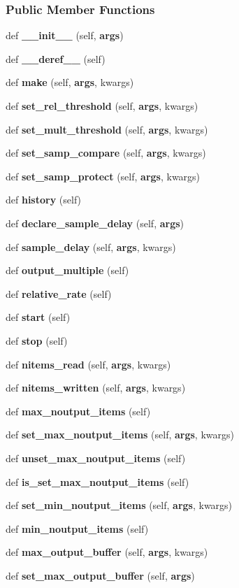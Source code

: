 \subsubsection*{Public Member Functions}
\begin{DoxyCompactItemize}
\item 
def {\bf \+\_\+\+\_\+init\+\_\+\+\_\+} (self, {\bf args})
\item 
def {\bf \+\_\+\+\_\+deref\+\_\+\+\_\+} (self)
\item 
def {\bf make} (self, {\bf args}, kwargs)
\item 
def {\bf set\+\_\+rel\+\_\+threshold} (self, {\bf args}, kwargs)
\item 
def {\bf set\+\_\+mult\+\_\+threshold} (self, {\bf args}, kwargs)
\item 
def {\bf set\+\_\+samp\+\_\+compare} (self, {\bf args}, kwargs)
\item 
def {\bf set\+\_\+samp\+\_\+protect} (self, {\bf args}, kwargs)
\item 
def {\bf history} (self)
\item 
def {\bf declare\+\_\+sample\+\_\+delay} (self, {\bf args})
\item 
def {\bf sample\+\_\+delay} (self, {\bf args}, kwargs)
\item 
def {\bf output\+\_\+multiple} (self)
\item 
def {\bf relative\+\_\+rate} (self)
\item 
def {\bf start} (self)
\item 
def {\bf stop} (self)
\item 
def {\bf nitems\+\_\+read} (self, {\bf args}, kwargs)
\item 
def {\bf nitems\+\_\+written} (self, {\bf args}, kwargs)
\item 
def {\bf max\+\_\+noutput\+\_\+items} (self)
\item 
def {\bf set\+\_\+max\+\_\+noutput\+\_\+items} (self, {\bf args}, kwargs)
\item 
def {\bf unset\+\_\+max\+\_\+noutput\+\_\+items} (self)
\item 
def {\bf is\+\_\+set\+\_\+max\+\_\+noutput\+\_\+items} (self)
\item 
def {\bf set\+\_\+min\+\_\+noutput\+\_\+items} (self, {\bf args}, kwargs)
\item 
def {\bf min\+\_\+noutput\+\_\+items} (self)
\item 
def {\bf max\+\_\+output\+\_\+buffer} (self, {\bf args}, kwargs)
\item 
def {\bf set\+\_\+max\+\_\+output\+\_\+buffer} (self, {\bf args})

\end{DoxyCompactItemize}

